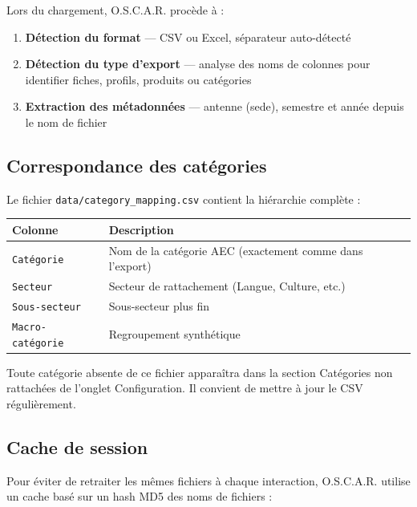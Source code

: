 \documentclass[12pt,a4paper,twoside]{article}
\begin{document}
Lors du chargement, O.S.C.A.R. proc\`{e}de \`{a} :

\begin{enumerate}[leftmargin=2em]
  \item \textbf{D\'{e}tection du format} --- CSV ou Excel, s\'{e}parateur auto-d\'{e}tect\'{e}
  \item \textbf{D\'{e}tection du type d'export} --- analyse des noms de colonnes pour identifier fiches, profils, produits ou cat\'{e}gories
  \item \textbf{Extraction des m\'{e}tadonn\'{e}es} --- antenne (sede), semestre et ann\'{e}e depuis le nom de fichier
\end{enumerate}

\subsection{Correspondance des cat\'{e}gories}

Le fichier \texttt{data/category\_mapping.csv} contient la hi\'{e}rarchie compl\`{e}te :

\begin{center}
\begin{tabularx}{\textwidth}{lX}
\toprule
\textbf{Colonne} & \textbf{Description} \\
\midrule
\texttt{Catégorie} & Nom de la cat\'{e}gorie AEC (exactement comme dans l'export) \\
\texttt{Secteur} & Secteur de rattachement (Langue, Culture, etc.) \\
\texttt{Sous-secteur} & Sous-secteur plus fin \\
\texttt{Macro-catégorie} & Regroupement synth\'{e}tique \\
\bottomrule
\end{tabularx}
\end{center}

\begin{warnbox}[Attention]
Toute cat\'{e}gorie absente de ce fichier appara\^{i}tra dans la section \og{}Cat\'{e}gories non rattach\'{e}es\fg{} de l'onglet Configuration. Il convient de mettre \`{a} jour le CSV r\'{e}guli\`{e}rement.
\end{warnbox}

\subsection{Cache de session}

Pour \'{e}viter de retraiter les m\^{e}mes fichiers \`{a} chaque interaction, O.S.C.A.R. utilise un cache bas\'{e} sur un hash MD5 des noms de fichiers :
\end{document}
